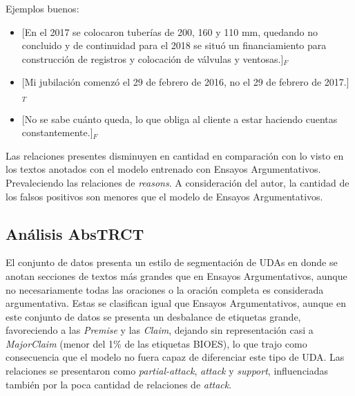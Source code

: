 \documentclass[a4paper,11pt,twocolumn,twoside]{article}
\begin{document}
Ejemplos buenos:
\begin{itemize}
	\item \text{} [En el 2017 se colocaron tuberías de 200, 160 y 110 mm, quedando no concluido y de
		      continuidad para el 2018 se situó un financiamiento para construcción de registros y colocación de 
		      válvulas y ventosas.]$_F$ %
	\item \text{} [Mi jubilación comenzó el 29 de febrero de 2016, no el 29 de febrero de 2017.]$_T$ %
	\item \text{} [No se sabe cuánto queda, lo que obliga al cliente a estar haciendo cuentas constantemente.]$_F$ %
\end{itemize}

Las relaciones presentes disminuyen en cantidad en comparación con lo visto en los textos anotados con el modelo 
entrenado con Ensayos Argumentativos. Prevaleciendo las relaciones de \textit{reasons}. A consideración del autor,
la cantidad de los falsos positivos son menores que el modelo de Ensayos Argumentativos.

\subsection{Análisis AbsTRCT}


El conjunto de datos presenta un estilo de segmentación de UDAs en donde se anotan 
secciones de textos más grandes que en Ensayos Argumentativos, aunque no necesariamente 
todas las oraciones o la oración completa es considerada argumentativa. 
Estas se clasifican igual que Ensayos Argumentativos, aunque 
en este conjunto de datos se presenta un desbalance de etiquetas grande, favoreciendo 
a las \textit{Premise} y las \textit{Claim}, dejando sin representación casi a \textit{MajorClaim}
(menor del 1\% de las etiquetas BIOES), lo que trajo como consecuencia que el modelo no fuera 
capaz de diferenciar este tipo de UDA. Las relaciones se presentaron como \textit{partial-attack},
\textit{attack} y \textit{support}, influenciadas también por la poca cantidad de relaciones de \textit{attack}.
\end{document}

